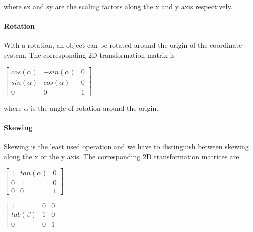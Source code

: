 where sx and sy are the scaling factors along the x and y axis respectively.

\paragraph{Rotation}
With a rotation, an object can be rotated around the origin of the coordinate system.
The corresponding 2D transformation matrix is

\hspace*{0.4cm}
\begin{center}
\begin{math}\left[ \begin{array}{ccc} cos(\alpha) & -sin(\alpha) & 0 \\ sin(\alpha) & cos(\alpha) & 0 \\ 0 & 0 & 1\end{array}\right]\end{math}
\end{center}
\hspace*{0.4cm}

where $\alpha$ is the angle of rotation around the origin.

\paragraph{Skewing}
Skewing is the least used operation and we have to distinguish between skewing along the x or the y axis.
The corresponding 2D transformation matrices are

\hspace*{0.4cm}
\begin{center}
\begin{math}\left[ \begin{array}{ccc} 1 & tan(\alpha) & 0 \\ 0 & 1 & 0 \\ 0 & 0 & 1\end{array}\right]\end{math}
\end{center}
\hspace*{0.4cm}


\hspace*{0.4cm}
\begin{center}
\begin{math}\left[ \begin{array}{ccc} 1 & 0 & 0 \\ tab(\beta) & 1 & 0 \\ 0 & 0 & 1\end{array}\right]\end{math}
\end{center}
\hspace*{0.4cm}

